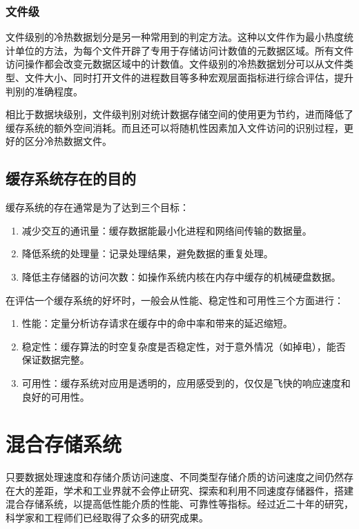 \subsubsection{文件级}

文件级别的冷热数据划分\cite{linlin2011}是另一种常用到的判定方法。这种以文件作为最小热度统计单位的方法，为每个文件开辟了专用于存储访问计数值的元数据区域。所有文件访问操作都会改变元数据区域中的计数值。文件级别的冷热数据划分可以从文件类型、文件大小、同时打开文件的进程数目等多种宏观层面指标进行综合评估，提升判别的准确程度。

相比于数据块级别，文件级判别对统计数据存储空间的使用更为节约，进而降低了缓存系统的额外空间消耗。而且还可以将随机性因素加入文件访问的识别过程，更好的区分冷热数据文件。

\subsection{缓存系统存在的目的}
缓存系统的存在通常是为了达到三个目标：
\begin{enumerate}
\item 减少交互的通讯量：缓存数据能最小化进程和网络间传输的数据量。
\item 降低系统的处理量：记录处理结果，避免数据的重复处理。
\item 降低主存储器的访问次数：如操作系统内核在内存中缓存的机械硬盘数据。
\end{enumerate}

在评估一个缓存系统的好坏时，一般会从性能、稳定性和可用性三个方面进行：
\begin{enumerate}
\item 性能：定量分析访存请求在缓存中的命中率和带来的延迟缩短。
\item 稳定性：缓存算法的时空复杂度是否稳定性，对于意外情况（如掉电），能否保证数据完整。
\item 可用性：缓存系统对应用是透明的，应用感受到的，仅仅是飞快的响应速度和良好的可用性。
\end{enumerate}

\section{混合存储系统}
\label{sec:hybrid_storage}

只要数据处理速度和存储介质访问速度、不同类型存储介质的访问速度之间仍然存在大的差距，学术和工业界就不会停止研究、探索和利用不同速度存储器件，搭建混合存储系统\cite{zhuqing2013hybrid}，以提高低性能介质的性能、可靠性等指标。经过近二十年的研究，科学家和工程师们已经取得了众多的研究成果。

